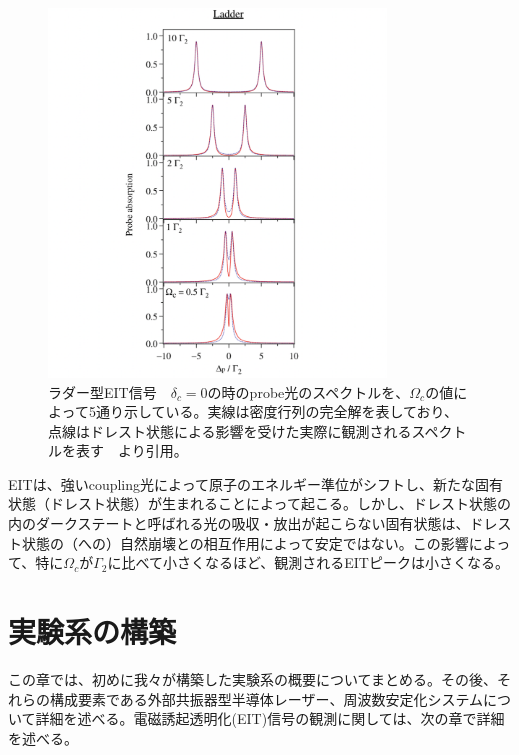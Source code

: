 \documentclass[dvipdfmx]{jsreport}
\begin{document}
\begin{figure}[hbtp]
\centering
\includegraphics[width=0.8\textwidth]{images/eit_absorption.png}
\caption{\label{fig:absorption} ラダー型EIT信号　$\delta_c = 0$の時のprobe光のスペクトルを、$\Omega_c$の値によって5通り示している。実線は密度行列の完全解を表しており、点線はドレスト状態による影響を受けた実際に観測されるスペクトルを表す　\cite{eit-absorption}より引用。}
\end{figure}

EITは、強いcoupling光によって原子のエネルギー準位がシフトし、新たな固有状態（ドレスト状態）が生まれることによって起こる。しかし、ドレスト状態の内のダークステートと呼ばれる光の吸収・放出が起こらない固有状態は、ドレスト状態の（への）自然崩壊との相互作用によって安定ではない。この影響によって、特に$\Omega_c$が$\Gamma_2$に比べて小さくなるほど、観測されるEITピークは小さくなる。

\clearpage
\chapter{実験系の構築}
この章では、初めに我々が構築した実験系の概要についてまとめる。その後、それらの構成要素である外部共振器型半導体レーザー、周波数安定化システムについて詳細を述べる。電磁誘起透明化(EIT)信号の観測に関しては、次の章で詳細を述べる。
\end{document}
